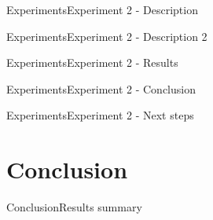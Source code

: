 \documentclass[xcolor=table]{beamer}
\begin{document}
\begin{frame}{Experiments}{Experiment 2 - Description}



 

\end{frame}




\begin{frame}{Experiments}{Experiment 2 - Description 2}



\end{frame}


\begin{frame}{Experiments}{Experiment 2 - Results}


\end{frame}

\begin{frame}{Experiments}{Experiment 2 - Conclusion}





\end{frame}

\begin{frame}{Experiments}{Experiment 2 - Next steps}


\end{frame}


\section{Conclusion}
\begin{frame}{Conclusion}{Results summary}

\end{frame}
\end{document}
